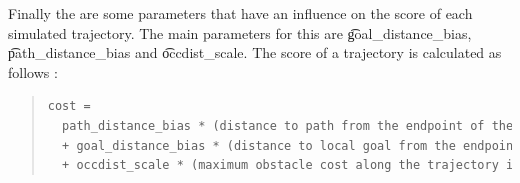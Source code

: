 Finally the are some parameters that have an influence on the score of each simulated trajectory. The main parameters for this are \t{goal_distance_bias}, \t{path_distance_bias} and \t{occdist_scale}. The score of a trajectory is calculated as follows \cite{ROSorg}:

\begin{quote}
\begin{lstlisting}[language = XML]
	cost =
  path_distance_bias * (distance to path from the endpoint of the trajectory in meters)
  + goal_distance_bias * (distance to local goal from the endpoint of the trajectory in meters)
  + occdist_scale * (maximum obstacle cost along the trajectory in obstacle cost (0-254))
\end{lstlisting}
\end{quote}

